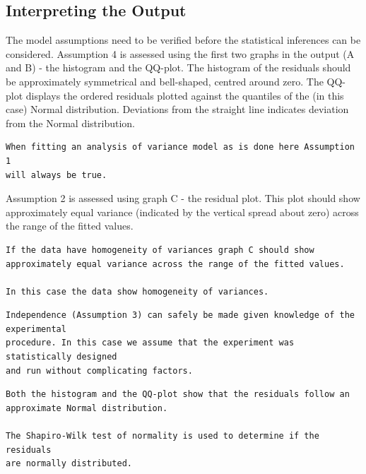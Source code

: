 \documentclass[a4paper, 10pt, fleqn, twosided]{memoir}
\begin{document}
\subsection{Interpreting the Output}

The model assumptions need to be verified before the statistical inferences can be considered. Assumption 4 is assessed
using the first two graphs in the output (A and B) - the histogram and the QQ-plot. The histogram of the residuals
should be approximately symmetrical and bell-shaped, centred around zero. The QQ-plot displays the ordered residuals
plotted against the quantiles of the (in this case) Normal distribution. Deviations from the straight line indicates
deviation from the Normal distribution.

\begin{tcolorbox}[title = Example 2 Assumption 1]
\begin{verbatim}
When fitting an analysis of variance model as is done here Assumption 1
will always be true.
\end{verbatim}
\end{tcolorbox}


Assumption 2 is assessed using graph C - the residual plot. This plot should show approximately equal variance
(indicated by the vertical spread about zero) across the range of the fitted values.

\begin{tcolorbox}[title = Example 2 Assumption 2]
\begin{verbatim}
If the data have homogeneity of variances graph C should show
approximately equal variance across the range of the fitted values.

In this case the data show homogeneity of variances.
\end{verbatim}
\end{tcolorbox}

\begin{tcolorbox}[title = Example 2 Assumption 3]
\begin{verbatim}
Independence (Assumption 3) can safely be made given knowledge of the experimental
procedure. In this case we assume that the experiment was statistically designed
and run without complicating factors.
\end{verbatim}
\end{tcolorbox}

\begin{tcolorbox}[title = Example 2 Assumption 4]
\begin{verbatim}
Both the histogram and the QQ-plot show that the residuals follow an
approximate Normal distribution.

The Shapiro-Wilk test of normality is used to determine if the residuals
are normally distributed.
\end{verbatim}
\end{tcolorbox}
\end{document}
